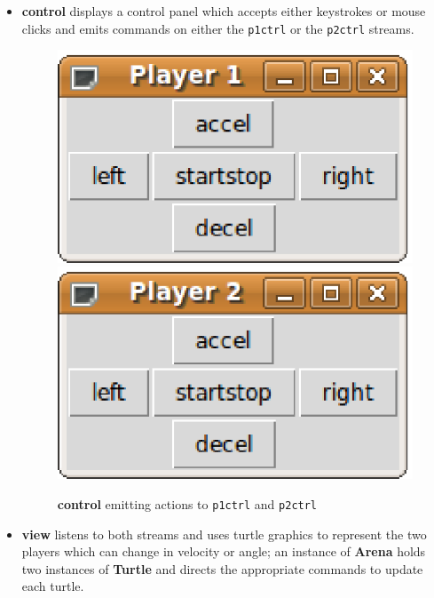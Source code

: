 \documentclass[12pt,a4,notitlepage]{report}
\renewcommand{\_}{\texttt{\symbol{95}}}
\newcommand{\<}{\texttt{\symbol{60}}}
\renewcommand{\>}{\texttt{\symbol{62}}}
\newcommand{\class}[1]{\textbf{#1}}
\newcommand{\scopendpoint}[1]{\texttt{#1}}
\begin{document}
\begin{itemize}
\item \class{control} displays a control panel which accepts either keystrokes or mouse clicks and emits commands on either the \scopendpoint{p1ctrl} or the \scopendpoint{p2ctrl} streams.

\begin{figure}[hb]
\centering
\includegraphics[scale=0.5,angle=0]{images/ControlP1.ps}
\includegraphics[scale=0.5,angle=0]{images/ControlP2.ps}
\caption{\class{control} emitting actions to \scopendpoint{p1ctrl} and \scopendpoint{p2ctrl}}
\label{control}
\end{figure}

\item \class{view} listens to both streams and uses turtle graphics to represent the two players which can change in velocity or angle; an instance of \class{Arena} holds two instances of \class{Turtle} and directs the appropriate commands to update each turtle.


\end{itemize}
\end{document}
